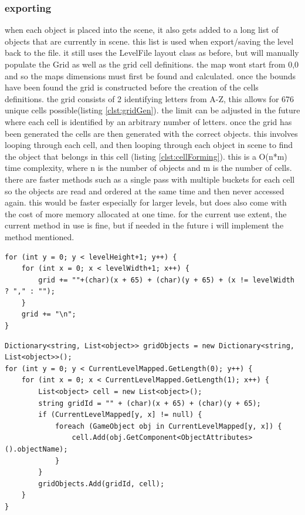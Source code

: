 \subsubsection{exporting}
when each object is placed into the scene, it also gets added to a long list of objects that are currently in scene. this list is used when export/saving the level back to the file. it still uses the LevelFile layout class as before, but will manually populate the Grid as well as the grid cell definitions. the map wont start from 0,0 and so the maps dimensions must first be found and calculated. once the bounds have been found the grid is constructed before the creation of the cells definitions. the grid consists of 2 identifying letters from A-Z, this allows for 676 unique cells possible(listing \ref{clst:gridGen}). the limit can be adjusted in the future where each cell is identified by an arbitrary number of letters. once the grid has been generated the cells are then generated with the correct objects. this involves looping through each cell, and then looping through each object in scene to find the object that belongs in this cell (listing \ref{clst:cellForming}). this is a O(n*m) time complexity, where n is the number of objects and m is the number of cells. there are faster methods such as a single pass with multiple buckets for each cell so the objects are read and ordered at the same time and then never accessed again. this would be faster especially for larger levels, but does also come with the cost of more memory allocated at one time. for the current use extent, the current method in use is fine, but if needed in the future i will implement the method mentioned.

\begin{minipage}{\textwidth}
\begin{lstlisting}[language={[Sharp]C}, caption=grid generation, label=clst:gridGen]
for (int y = 0; y < levelHeight+1; y++) {
	for (int x = 0; x < levelWidth+1; x++) {
		grid += ""+(char)(x + 65) + (char)(y + 65) + (x != levelWidth ? "," : "");
	}
	grid += "\n";
}
\end{lstlisting}
\end{minipage}


\begin{minipage}{\textwidth}
\begin{lstlisting}[language={[Sharp]C}, caption=code used for cell forming, label=clst:cellForming]
Dictionary<string, List<object>> gridObjects = new Dictionary<string, List<object>>();
for (int y = 0; y < CurrentLevelMapped.GetLength(0); y++) {
	for (int x = 0; x < CurrentLevelMapped.GetLength(1); x++) {
		List<object> cell = new List<object>();
		string gridId = "" + (char)(x + 65) + (char)(y + 65);
		if (CurrentLevelMapped[y, x] != null) {
			foreach (GameObject obj in CurrentLevelMapped[y, x]) {
				cell.Add(obj.GetComponent<ObjectAttributes>().objectName);
			}
		}
		gridObjects.Add(gridId, cell);
	}
}
\end{lstlisting}
\end{minipage}




